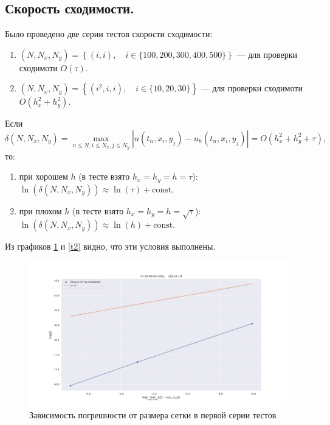 \documentclass[14pt,a4paper]{extarticle}
\newcommand{\1}{\mathbbm{1}}
\begin{document}
\subsection{Скорость сходимости.}
Было проведено две серии тестов скорости сходимости: 
\begin{enumerate}
    \item $(N, N_x, N_y) = \left\{(i, i), \quad i \in \{100, 200, 300, 400, 500\} \right\}$ --- для проверки сходимоти $O(\tau)$.
    \item $(N, N_x, N_y) = \left\{(i^2, i, i), \quad i \in \{10, 20, 30\} \right\}$ --- для проверки сходимоти $O(h_x^2 + h_y^2)$.
\end{enumerate}
Если 
$$\delta(N, N_x, N_y) = \max_{n\leq N, i \leq N_x, j \leq N_y} |u(t_n, x_i, y_j) - u_h(t_n, x_i, y_j)| = O(h_x^2 + h_y^2 + \tau),$$ 
то: 
\begin{enumerate}
    \item при хорошем $h$ (в тесте взято $h_x = h_y = h = \tau  $): \\$ \ln\left(\delta(N, N_x, N_y)\right) \approx \ln(\tau) + \text{const},$
    \item при плохом  $h$ (в тесте взято $h_x = h_y = h = \sqrt{\tau}$): \\$ \ln\left(\delta(N, N_x, N_y)\right) \approx \ln(h) + \text{const}.$
\end{enumerate}
Из графиков \ref{t1} и \ref{t2} видно, что эти условия выполнены. 
\begin{figure}
    \centering
    \includegraphics[scale=0.4]{figs/OrderCon1.pdf}
    \caption{Зависимость погрешности от размера сетки в первой серии тестов}
    \label{t1}
\end{figure}
\end{document}
